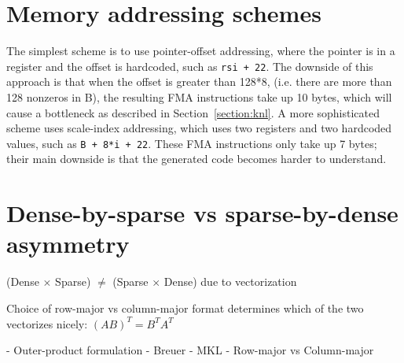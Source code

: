 \section{Memory addressing schemes}

The simplest scheme is to use pointer-offset addressing, where the pointer is in a register and the offset is hardcoded, such as \texttt{rsi + 22}. The downside of this approach is that when the offset is greater than 128*8, (i.e. there are more than 128 nonzeros in B), the resulting FMA instructions take up 10 bytes, which will cause a bottleneck as described in Section~\ref{section:knl}. A more sophisticated scheme uses scale-index addressing, which uses two registers and two hardcoded values, such as \texttt{B + 8*i + 22}. These FMA instructions only take up 7 bytes; their main downside is that the generated code becomes harder to understand.




\section{Dense-by-sparse vs sparse-by-dense asymmetry}
(Dense $\times$ Sparse) $\neq$ (Sparse $\times$ Dense) due to vectorization

Choice of row-major vs column-major format determines which of the two vectorizes nicely: $(AB)^T = B^T A^T$

- Outer-product formulation
- Breuer
- MKL
- Row-major vs Column-major

